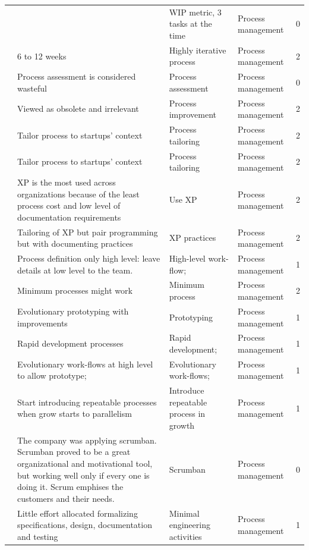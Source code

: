 \documentclass[final,5p,times,twocolumn]{elsarticle}
\begin{document}
\begin{center}
\begin{longtable}{|p{0.4in}|p{3in}|p{1.3in}|p{1in}|p{0.3in}|}
\cite{Kuvinka2011} &       & WIP metric, 3 tasks at the time & Process management & 0 \\
\cite{Ambler2002} & 6 to 12 weeks & Highly iterative process & Process management & 2 \\
\cite{Fayad1997} & Process assessment is considered wasteful & Process assessment & Process management & 0 \\
\cite{Zettel2001} & Viewed as obsolete and irrelevant & Process improvement & Process management & 2 \\
\cite{Coleman2007} & Tailor process to startups' context & Process tailoring & Process management & 2 \\
\cite{Coleman2008} & Tailor process to startups' context & Process tailoring & Process management & 2 \\
\cite{Coleman2007} & XP is the most used across organizations because of the least process cost and low level of documentation requirements & Use XP & Process management & 2 \\
\cite{Zettel2001} & Tailoring of XP but pair programming but with documenting practices & XP practices & Process management & 2 \\
\cite{Sutton2000} & Process definition only high level: leave details at low level to the team. & High-level work-flow; & Process management & 1 \\
\cite{Coleman2008a} & Minimum processes might work & Minimum process & Process management & 2 \\
\cite{Deakins2005} & Evolutionary prototyping with improvements & Prototyping & Process management & 1 \\
\cite{Deakins2005} & Rapid development processes & Rapid development; & Process management & 1 \\
\cite{Sutton2000} & Evolutionary work-flows at high level to allow prototype; & Evolutionary work-flows; & Process management & 1 \\
\cite{Crowne2002} & Start introducing repeatable processes when grow starts to parallelism & Introduce repeatable process in growth & Process management & 1 \\
\cite{Kuvinka2011} & The company was applying scrumban. Scrumban proved to be a great organizational and motivational tool, but working well only if every one is doing it. Scrum emphises the customers and their needs. & Scrumban & Process management & 0 \\
\cite{Camel1994a} & Little effort allocated formalizing specifications, design, documentation and testing & Minimal engineering activities & Process management & 1 \\

\end{longtable}
\end{center}
\end{document}
